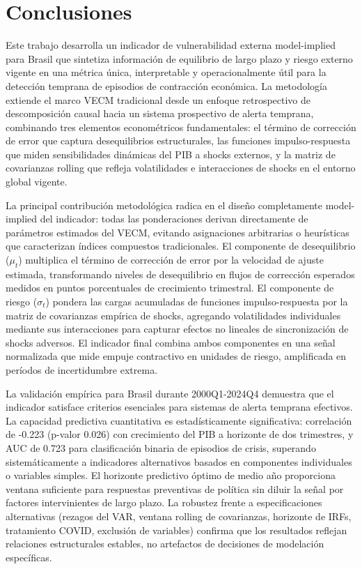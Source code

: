 \documentclass[3p,11pt,draft,natbib=false]{elsarticle}
\begin{document}
\section{Conclusiones}
\label{sec:conclusiones}

Este trabajo desarrolla un indicador de vulnerabilidad externa model-implied para Brasil que sintetiza información de equilibrio de largo plazo y riesgo externo vigente en una métrica única, interpretable y operacionalmente útil para la detección temprana de episodios de contracción económica. La metodología extiende el marco VECM tradicional desde un enfoque retrospectivo de descomposición causal hacia un sistema prospectivo de alerta temprana, combinando tres elementos econométricos fundamentales: el término de corrección de error que captura desequilibrios estructurales, las funciones impulso-respuesta que miden sensibilidades dinámicas del PIB a shocks externos, y la matriz de covarianzas rolling que refleja volatilidades e interacciones de shocks en el entorno global vigente.

La principal contribución metodológica radica en el diseño completamente model-implied del indicador: todas las ponderaciones derivan directamente de parámetros estimados del VECM, evitando asignaciones arbitrarias o heurísticas que caracterizan índices compuestos tradicionales. El componente de desequilibrio ($\mu_t$) multiplica el término de corrección de error por la velocidad de ajuste estimada, transformando niveles de desequilibrio en flujos de corrección esperados medidos en puntos porcentuales de crecimiento trimestral. El componente de riesgo ($\sigma_t$) pondera las cargas acumuladas de funciones impulso-respuesta por la matriz de covarianzas empírica de shocks, agregando volatilidades individuales mediante sus interacciones para capturar efectos no lineales de sincronización de shocks adversos. El indicador final combina ambos componentes en una señal normalizada que mide empuje contractivo en unidades de riesgo, amplificada en períodos de incertidumbre extrema.

La validación empírica para Brasil durante 2000Q1-2024Q4 demuestra que el indicador satisface criterios esenciales para sistemas de alerta temprana efectivos. La capacidad predictiva cuantitativa es estadísticamente significativa: correlación de -0.223 (p-valor 0.026) con crecimiento del PIB a horizonte de dos trimestres, y AUC de 0.723 para clasificación binaria de episodios de crisis, superando sistemáticamente a indicadores alternativos basados en componentes individuales o variables simples. El horizonte predictivo óptimo de medio año proporciona ventana suficiente para respuestas preventivas de política sin diluir la señal por factores intervinientes de largo plazo. La robustez frente a especificaciones alternativas (rezagos del VAR, ventana rolling de covarianzas, horizonte de IRFs, tratamiento COVID, exclusión de variables) confirma que los resultados reflejan relaciones estructurales estables, no artefactos de decisiones de modelación específicas.
\end{document}
